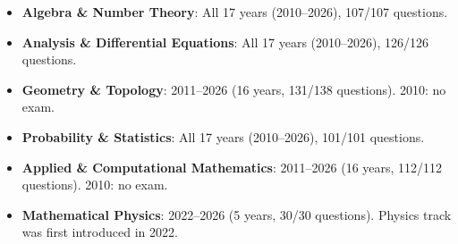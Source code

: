 \begin{itemize}
    \item \textbf{Algebra \& Number Theory}: All 17 years (2010--2026), 107/107 questions. \done
    \item \textbf{Analysis \& Differential Equations}: All 17 years (2010--2026), 126/126 questions. \done
    \item \textbf{Geometry \& Topology}: 2011--2026 (16 years, 131/138 questions). 2010: no exam. \done
    \item \textbf{Probability \& Statistics}: All 17 years (2010--2026), 101/101 questions. \done
    \item \textbf{Applied \& Computational Mathematics}: 2011--2026 (16 years, 112/112 questions). 2010: no exam. \done
    \item \textbf{Mathematical Physics}: 2022--2026 (5 years, 30/30 questions). Physics track was first introduced in 2022. \done
\end{itemize}
